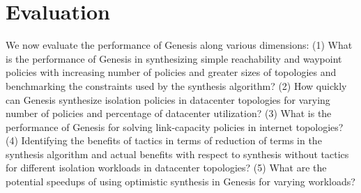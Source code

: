 \section{Evaluation}
We now evaluate the performance of Genesis along various dimensions:
 (1) What is the performance of Genesis in synthesizing simple reachability and waypoint policies
  with increasing number of policies and greater sizes of topologies and benchmarking the constraints used by the synthesis algorithm? 
  (2) How quickly can Genesis synthesize isolation policies in datacenter topologies for varying number of policies and percentage of
   datacenter utilization? 
   (3) What is the performance of Genesis for solving link-capacity policies in internet topologies? 
   (4) Identifying the benefits of tactics in terms of reduction of terms in the synthesis algorithm and actual benefits 
   with respect to synthesis without tactics for different isolation workloads in datacenter topologies? 
   (5) What are the potential speedups of using optimistic synthesis in Genesis for varying workloads? 




